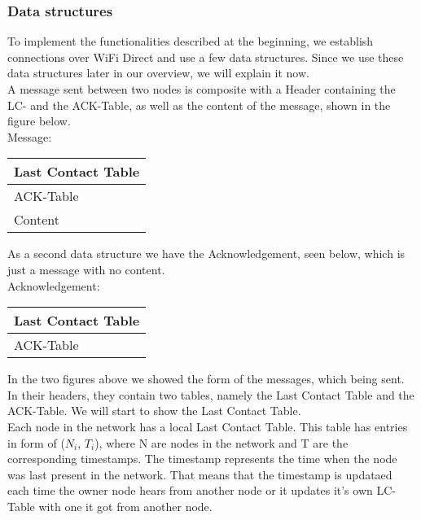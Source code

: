 	\subsubsection{Data structures}
	To implement the functionalities described at the beginning, we establish connections over WiFi Direct and use a few data structures. Since we use these data structures later in our overview, we will explain it now. \\

	A message sent between two nodes is composite with a Header containing the LC- and the ACK-Table, as well as the content of the message, shown in the figure below. \\

	Message:
		\begin{center}
			\begin{tabular}{ | l |}
				\hline
				Last Contact Table \\ \hline
				ACK-Table \\ \hline
				Content \\ \hline
			\end{tabular}
		\end{center}


As a second data structure we have the Acknowledgement, seen below, which is just a message with no content. \\


	Acknowledgement:
		\begin{center}
			\begin{tabular}{ | l |}
				\hline
				Last Contact Table \\ \hline
				ACK-Table \\ \hline
			\end{tabular}
		\end{center}
			
In the two figures above we showed the form of the messages, which being sent. In their headers, they contain two tables, namely the Last Contact Table and the ACK-Table. We will start to show the Last Contact Table. \\

Each node in the network has a local Last Contact Table. This table has entries in form of ($N_{i}$, $T_{i}$), where N are nodes in the network and T are the corresponding timestamps. The timestamp represents the time when the node was last present in the network. That means that the timestamp is updataed each time the owner node hears from another node or it updates it's own LC-Table with one it got from another node. \\


